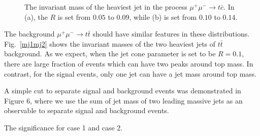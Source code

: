 \documentclass[a4paper,11pt]{article}
\begin{document}
\begin{figure}[htbp]
  \centering
  \caption{The invariant mass of the heaviest jet in the process $\mu^+\mu^-\to t\bar{c}$. In (a), the $R$ is set from $0.05$ to $0.09$, while (b) is set from $0.10$ to $0.14$.}\label{sig:mj2}
\end{figure}

The background $\mu^+\mu^-\to t\bar{t}$ should have similar features in these distributions. 
Fig.~\ref{mj1mj2} shows the invariant masses of the two heaviest jets of $t\bar{t}$ background. 
As we expect, when the jet cone parameter is set to be $R=0.1$, there are large fraction of events which can have two peaks around top mass. In contrast, for the signal events, only one jet can have a jet mass around top mass.

A simple cut to separate signal and background events was demonstrated in Figure 6, where we use the sum of jet mass of two leading massive jets as an observable to separate signal and background events.

The significance for case 1 and case 2.
\end{document}

